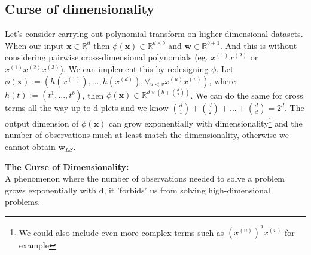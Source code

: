 \subsection{Curse of dimensionality}
Let's consider carrying out polynomial transform on higher dimensional datasets. When our input $\bm{x} \in \mathbb{R}^{d}$ then $\phi(\bm{x}) \in \mathbb{R}^{d \times b}$ and $\bm{w} \in \mathbb{R}^{b+1}$. And this is without considering pairwise cross-dimensional polynomials (eg. $x^{(1)}x^{(2)}$ or $x^{(1)}x^{(2)}x^{(3)}$). We can implement this by redesigning $\phi$. Let $\phi(\bm{x}) := (h(x^{(1)}),...,h(x^{(d)}), \forall_{u<v} x^{(u)}x^{(v)})$, where $h(t):=(t^{1}, ..., t^{b})$, then $\phi(\bm{x}) \in \mathbb{R}^{d \times (b+ {d \choose 2})}$. We can do the same for cross terms all the way up to d-plets and we know $ {d \choose 1} + {d \choose 2} + ... + {d \choose d} = 2^{d}$. The output dimension of $\phi(\bm{x})$ can grow exponentially with dimensionality\footnote{We could also include even more complex terms such as $(x^{(u)})^{2} x^{(v)}$ for example} and the number of observations much at least match the dimensionality, otherwise we cannot obtain $\bm{w}_{LS}$.
\begin{definition}
    \textbf{The Curse of Dimensionality:} \\
    A phenomenon where the number of observations needed to solve a problem grows exponentially with d, it 'forbids' us from solving high-dimensional problems.
\end{definition}